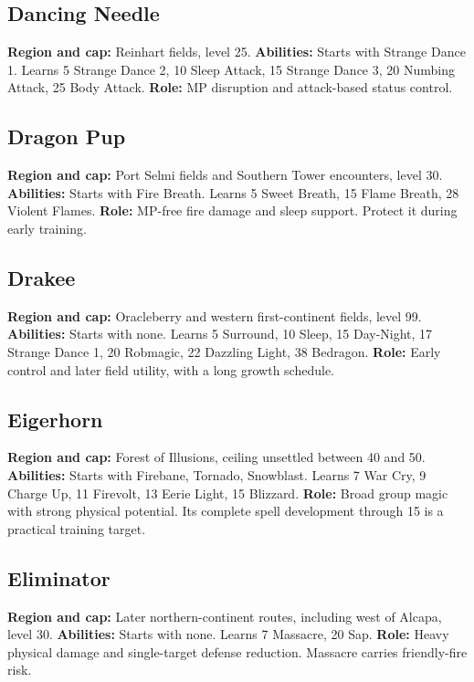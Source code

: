 \subsection{Dancing Needle}
\textbf{Region and cap:} Reinhart fields, level 25.
\textbf{Abilities:} Starts with Strange Dance 1. Learns 5 Strange Dance 2,
10 Sleep Attack, 15 Strange Dance 3, 20 Numbing Attack, 25 Body Attack.
\textbf{Role:} MP disruption and attack-based status control.

\subsection{Dragon Pup}
\textbf{Region and cap:} Port Selmi fields and Southern Tower encounters, level 30.
\textbf{Abilities:} Starts with Fire Breath. Learns 5 Sweet Breath,
15 Flame Breath, 28 Violent Flames.
\textbf{Role:} MP-free fire damage and sleep support. Protect it during early training.

\subsection{Drakee}
\textbf{Region and cap:} Oracleberry and western first-continent fields, level 99.
\textbf{Abilities:} Starts with none. Learns 5 Surround, 10 Sleep,
15 Day-Night, 17 Strange Dance 1, 20 Robmagic, 22 Dazzling Light, 38 Bedragon.
\textbf{Role:} Early control and later field utility, with a long growth schedule.

\subsection{Eigerhorn}
\textbf{Region and cap:} Forest of Illusions, ceiling unsettled between 40 and 50.
\textbf{Abilities:} Starts with Firebane, Tornado, Snowblast. Learns 7 War Cry,
9 Charge Up, 11 Firevolt, 13 Eerie Light, 15 Blizzard.
\textbf{Role:} Broad group magic with strong physical potential. Its complete
spell development through 15 is a practical training target.

\subsection{Eliminator}
\textbf{Region and cap:} Later northern-continent routes, including west of Alcapa, level 30.
\textbf{Abilities:} Starts with none. Learns 7 Massacre, 20 Sap.
\textbf{Role:} Heavy physical damage and single-target defense reduction.
Massacre carries friendly-fire risk.

